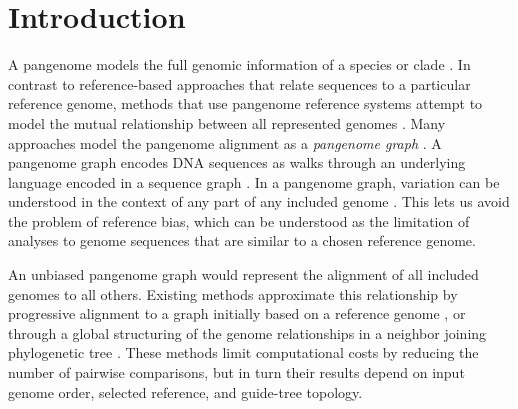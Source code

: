 \documentclass{bioinfo}
\theoremstyle{definition}
\begin{document}
\maketitle


\section{Introduction}
\label{sec:introduction}
A pangenome models the full genomic information of a species or clade \citep{Medini_2005,Sherman_2020}.
In contrast to reference-based approaches that relate sequences to a particular reference genome, methods that use pangenome reference systems attempt to model the mutual relationship between all represented genomes \citep{cpang2018}.
Many approaches model the pangenome alignment as a \textit{pangenome graph} \cite{Garrison_2018,Yokoyama2019,Hickey:2020}.
A pangenome graph encodes DNA sequences as walks through an underlying language encoded in a sequence graph \citep{Hein_1989}.
In a pangenome graph, variation can be understood in the context of any part of any included genome  \citep{Eizenga_2020}.
This lets us avoid the problem of reference bias, which can be understood as the limitation of analyses to genome sequences that are similar to a chosen reference genome.

An unbiased pangenome graph would represent the alignment of all included genomes to all others.
Existing methods approximate this relationship by progressive alignment to a graph initially based on a reference genome \citep{Li:2020}, or through a global structuring of the genome relationships in a neighbor joining phylogenetic tree \citep{Armstrong:2020}.
These methods limit computational costs by reducing the number of pairwise comparisons, but in turn their results depend on input genome order, selected reference, and guide-tree topology.
\end{document}
